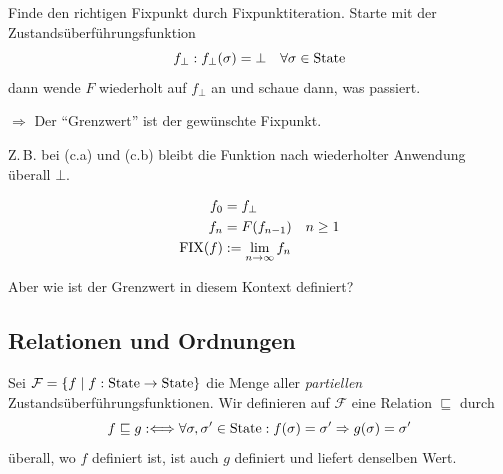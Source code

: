 \begin{remark}[Idee]
    Finde den richtigen Fixpunkt durch Fixpunktiteration. Starte mit der Zustandsüberführungsfunktion \[
    f_{\bot} : f_{\bot}(\sigma) = \bot \quad \forall \sigma \in \operatorname{State}
    \]
    dann wende $F$ wiederholt auf $f_{\bot}$ an und schaue dann, was passiert.

    $\Rightarrow$ Der ``Grenzwert'' ist der gewünschte Fixpunkt.

    Z.\,B. bei (c.a) und (c.b) bleibt die Funktion nach wiederholter Anwendung überall $\bot$.
\end{remark}

\begin{definition}[Fixpunktoperator]
    \begin{align*}
        f_0 & = f_{\bot} \\
        f_n &= F(f_{n-1}) \quad n \geq 1 \\
        \operatorname{FIX}(f) & := \lim_{n \to \infty} f_n
    \end{align*}

    Aber wie ist der Grenzwert in diesem Kontext definiert?
\end{definition}



\subsection{Relationen und Ordnungen}

\begin{definition}
    Sei $\mathcal{F} = \{ f \;\vert\; f: \operatorname{State} \to \operatorname{State} \}$ die Menge aller \emph{partiellen} Zustandsüberführungsfunktionen. Wir definieren auf $\mathcal{F}$ eine Relation $\sqsubseteq$ durch \[
        f \sqsubseteq g :\Longleftrightarrow \forall \sigma, \sigma' \in \operatorname{State}: f(\sigma) = \sigma' \Rightarrow g(\sigma) = \sigma'
        \]
        \dh{} überall, wo $f$ definiert ist, ist auch $g$ definiert und liefert denselben Wert.
\end{definition}

